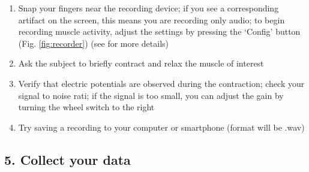 \documentclass[12pt]{article}
\begin{document}
\begin{enumerate}
\item Snap your fingers near the recording device; if you see a corresponding artifact on the screen, this means you are recording only audio; to begin recording muscle activity, adjust the settings by pressing the `Config' button (Fig. \ref{fig:recorder}) (see \cite{spikeRecorder} for more details)
\item Ask the subject to briefly contract and relax the muscle of interest 
\item Verify that electric potentials are observed during the contraction; check your signal to noise rati; if the signal is too small, you can adjust the gain by turning the wheel switch to the right
\item Try saving a recording to your computer or smartphone (format will be .wav)
\end{enumerate}

\subsection*{5. Collect your data}
\end{document}

